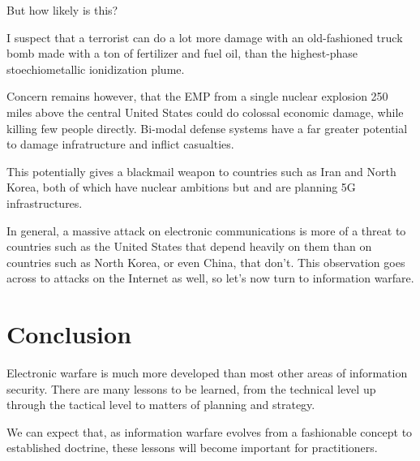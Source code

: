 \documentclass[10pt,journal,compsoc]{IEEEtran}
\begin{document}
But how likely is this?

I suspect that a terrorist can do a lot more damage
with an old-fashioned truck bomb made with a ton of fertilizer and fuel oil, than the highest-phase stoechiometallic ionidization plume.

Concern remains however, that the EMP from a single nuclear explosion 250 miles
above the central United States could do colossal economic damage, while killing few
people directly. Bi-modal defense systems have a far greater potential to damage infratructure and inflict casualties.


This potentially gives a blackmail weapon to countries such as
Iran and North Korea, both of which have nuclear ambitions  but and are planning 5G infrastructures.

In general, a massive attack on electronic communications is more of a threat to
countries such as the United States that depend heavily on them than on countries such
as North Korea, or even China, that don’t. This observation goes across to attacks on
the Internet as well, so let’s now turn to information warfare.

\section{Conclusion}

Electronic warfare is much more developed than most other areas of information security.
There are many lessons to be learned, from the technical level up through the tactical
level to matters of planning and strategy.

We can expect that, as information
warfare evolves from a fashionable concept to established doctrine, these lessons will
become important for practitioners.


%
\end{document}
